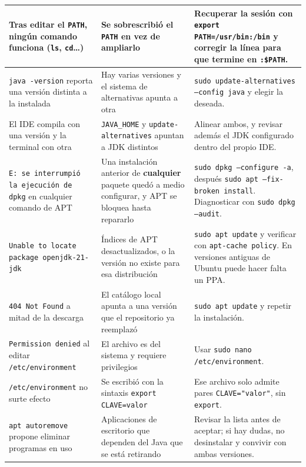 \begin{longtable}{|>{\raggedright\arraybackslash}p{4.1cm}|>{\raggedright\arraybackslash}p{4.6cm}|>{\raggedright\arraybackslash}p{5.5cm}|}
	Tras editar el \texttt{PATH}, ningún comando funciona (\texttt{ls}, \texttt{cd}\dots)
	& Se sobrescribió el \texttt{PATH} en vez de ampliarlo & Recuperar la sesión con
	\texttt{export PATH=/usr/bin:/bin} y corregir la línea para que termine en
	\texttt{:\$PATH}. \\ \hline

	\texttt{java -version} reporta una versión distinta a la instalada & Hay varias
	versiones y el sistema de alternativas apunta a otra & \texttt{sudo
	update-alternatives --config java} y elegir la deseada. \\ \hline

	El IDE compila con una versión y la terminal con otra & \texttt{JAVA\_HOME} y
	\texttt{update-alternatives} apuntan a JDK distintos & Alinear ambos, y revisar
	además el JDK configurado dentro del propio IDE. \\ \hline

	\texttt{E: se interrumpió la ejecución de dpkg} en cualquier comando de APT & Una
	instalación anterior de \textbf{cualquier} paquete quedó a medio configurar, y APT se
	bloquea hasta repararlo & \texttt{sudo dpkg --configure -a}, después \texttt{sudo apt
	--fix-broken install}. Diagnosticar con \texttt{sudo dpkg --audit}. \\ \hline

	\texttt{Unable to locate package openjdk-21-jdk} & Índices de APT desactualizados, o
	la versión no existe para esa distribución & \texttt{sudo apt update} y verificar con
	\texttt{apt-cache policy}. En versiones antiguas de Ubuntu puede hacer falta un PPA.
	\\ \hline

	\texttt{404 Not Found} a mitad de la descarga & El catálogo local apunta a una
	versión que el repositorio ya reemplazó & \texttt{sudo apt update} y repetir la
	instalación. \\ \hline

	\texttt{Permission denied} al editar \texttt{/etc/environment} & El archivo es del
	sistema y requiere privilegios & Usar \texttt{sudo nano /etc/environment}. \\ \hline

	\texttt{/etc/environment} no surte efecto & Se escribió con la sintaxis
	\texttt{export CLAVE=valor} & Ese archivo solo admite pares \texttt{CLAVE="valor"},
	sin \texttt{export}. \\ \hline

	\texttt{apt autoremove} propone eliminar programas en uso & Aplicaciones de
	escritorio que dependen del Java que se está retirando & Revisar la lista antes de
	aceptar; si hay dudas, no desinstalar y convivir con ambas versiones. \\ \hline


\end{longtable}
